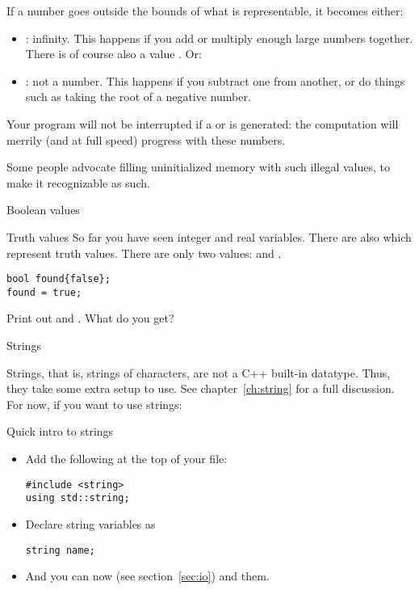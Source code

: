 If a number goes outside the bounds of what is representable, it
becomes either:
\begin{itemize}
\item {}: infinity. This happens if you add or multiply
  enough large numbers together. There is of course also a value
  . Or:
\item {}: not a number. This happens if you subtract
  one  from another, or do things such as taking the
  root of a negative number.
\end{itemize}
Your program will not be interrupted if a  or  is
generated: the computation will merrily (and at full speed) progress with these numbers.

Some people advocate filling uninitialized memory with such illegal
values, to make it recognizable as such.

 {Boolean values}

\begin{block}{Truth values}
  \label{sl:bool-var}
  So far you have seen integer and real variables. There are also
   which represent truth values. There are
  only two values:  and .
\begin{verbatim}
bool found{false};
found = true;
\end{verbatim}
\end{block}

\begin{exercise}
  \label{ex:print-truefalse}
  Print out  and . What do you get?
\end{exercise}

 {Strings}

Strings, that is, strings of characters, are not a C++ built-in
datatype. Thus, they take some extra setup to use.
See chapter~\ref{ch:string} for a full discussion.
For now, if you
want to use strings:

\begin{block}{Quick intro to strings}
  \label{sl:quick-string}
  \begin{itemize}
  \item Add the following at the top of your file:
\begin{verbatim}
#include <string>
using std::string;
\end{verbatim}
\item Declare string variables as
\begin{verbatim}
string name;
\end{verbatim}
\item And you can now  (see section~\ref{sec:io}) and  them.
  \end{itemize}
\end{block}

